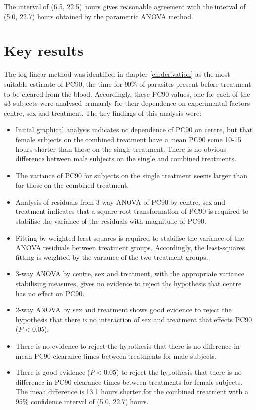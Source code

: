 The interval of (6.5, 22.5) hours gives reasonable agreement with the interval of (5.0, 22.7) hours obtained by the parametric ANOVA method.

\section{Key results}
The log-linear method was identified in chapter \ref{ch:derivation} as the most suitable estimate of PC90, the time for 90\% of parasites present before treatment to be cleared from the blood. Accordingly, these PC90 values, one for each of the 43 subjects were analysed primarily for their dependence on experimental factors centre, sex and treatment. The key findings of this analysis were:
\begin{itemize}
\item Initial graphical analysis indicates no dependence of PC90 on centre, but that female subjects on the combined treatment have a mean PC90 some 10-15 hours shorter than those on the single treatment. There is no obvious difference between male subjects on the single and combined treatments.
\item The variance of PC90 for subjects on the single treatment seems larger than for those on the combined treatment.
\item Analysis of residuals from 3-way ANOVA of PC90 by centre, sex and treatment indicates that a square root transformation of PC90 is required to stabilise the variance of the residuals with magnitude of PC90.
\item Fitting by weighted least-squares is required to stabilise the variance of the ANOVA residuals between treatment groups. Accordingly, the least-squares fitting is weighted by the variance of the two treatment groups. 
\item 3-way ANOVA by centre, sex and treatment, with the appropriate variance stabilising measures, gives no evidence to reject the hypothesis that centre has no effect on PC90.
\item 2-way ANOVA by sex and treatment shows good evidence to reject the hypothesis that there is no interaction of sex and treatment that effects PC90 ($P<0.05$).
\item There is no evidence to reject the hypothesis that there is no difference in mean PC90 clearance times between treatments for male subjects.
\item There is good evidence ($P<0.05$) to reject the hypothesis that there is no difference in PC90 clearance times between treatments for female subjects. The mean difference is 13.1 hours shorter for the combined treatment with a 95\% confidence interval of (5.0, 22.7) hours.

\end{itemize}

